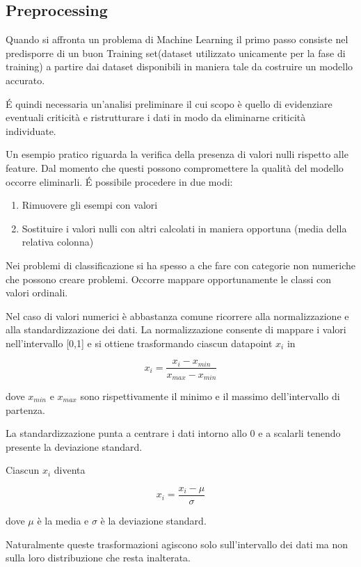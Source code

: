 \subsection{Preprocessing}
Quando si affronta un problema di Machine Learning il primo passo consiste nel predisporre di un buon Training set(dataset utilizzato unicamente per la fase di training) a partire dai dataset disponibili in maniera tale da costruire un modello accurato.

É quindi necessaria un’analisi preliminare il cui scopo è quello di evidenziare eventuali criticità e ristrutturare i dati in modo da eliminarne criticità individuate.

Un esempio pratico riguarda la verifica della presenza di valori nulli rispetto alle feature. Dal momento che questi possono compromettere la qualità del modello occorre eliminarli. É possibile procedere in due modi:

\begin{enumerate}
    \item Rimuovere gli esempi con valori 
    \item Sostituire i valori nulli con altri calcolati in maniera opportuna (media della relativa colonna)
\end{enumerate}
Nei problemi di classificazione si ha spesso a che fare con categorie non numeriche che possono creare problemi. Occorre mappare opportunamente le classi con valori ordinali.

Nel caso di valori numerici è abbastanza comune ricorrere alla normalizzazione e alla standardizzazione dei dati.
\newpage
La normalizzazione consente di mappare i valori nell’intervallo [0,1] e si ottiene trasformando ciascun datapoint $x_i$ in

$$x_i = \frac{x_i-x_{min}}{x_{max} - x_{min}}$$

dove $x_{min}$ e $x_{max}$ sono rispettivamente il minimo e il massimo dell’intervallo di partenza.

La standardizzazione punta a centrare i dati intorno allo 0 e a scalarli tenendo presente la deviazione standard.

Ciascun $x_i$ diventa

$$x_i = \frac{x_i-\mu}{\sigma}$$

dove $\mu$ è la media e $\sigma$ è la deviazione standard.

Naturalmente queste trasformazioni agiscono solo sull’intervallo dei dati ma non sulla loro distribuzione che resta inalterata.\cite{preprocessing}\newpage

